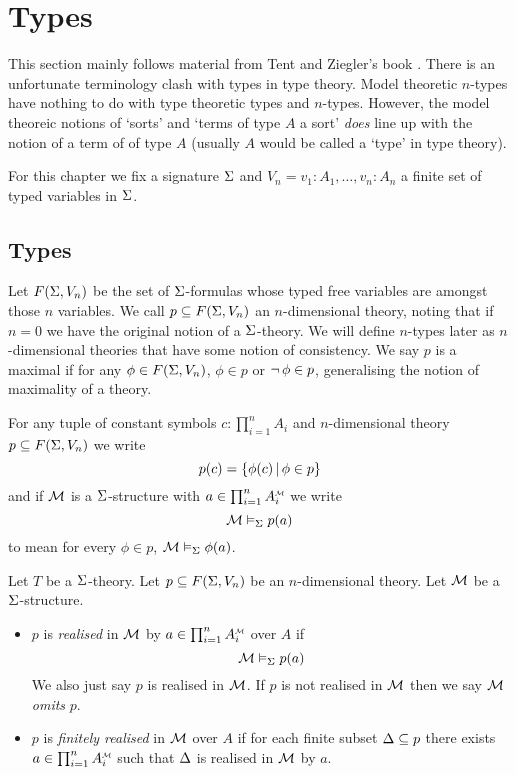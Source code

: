 \section{Types}
This section mainly follows material from Tent and Ziegler's book \cite{tent}.
There is an unfortunate terminology clash with types in type theory.
Model theoretic $n$-types have nothing to do with type theoretic 
types and $n$-types.
However, the model theoreic notions of `sorts' and `terms of type $A$ a sort' 
\textit{does} line up with the notion of a term of of type $A$ 
(usually $A$ would be called a `type' in type theory).

For this chapter we fix a signature $\Sigma$ and 
$V_n = {v_1 : A_1, \dots, v_n : A_n}$
a finite set of typed variables in $\Sigma$.

\subsection{Types}
\begin{dfn}
    Let $F(\Sigma,V_n)$ be the set of $\Sigma$-formulas whose typed free variables
    are amongst those $n$ variables.
    We call $p \subseteq F(\Sigma,V_n)$ an $n$-dimensional theory, 
    noting that if $n = 0$ we have the original notion of a $\Sigma$-theory.
    We will define $n$-types later as $n$-dimensional theories that have 
    some notion of consistency.
    We say $p$ is a maximal if for any $\phi \in F(\Sigma,V_n)$,
    $\phi \in p$ or $\neg\, \phi \in p$, 
    generalising the notion of maximality of a theory.

    For any tuple of constant symbols $c : \prod_{i = 1}^n A_i$
    and $n$-dimensional theory $p \subseteq F(\Sigma,V_n)$ we write 
    \[
        p(c) = \left\{\phi(c) \,|\, \phi \in p\right\}
    \]
    and if $\mathcal{M}$ is a $\Sigma$-structure with 
    $a \in \prod_{i=1}^n \mmintp{A_i}$ we write 
    \[
        \mathcal{M} \vDash_{\Sigma} p(a)
    \]
    to mean for every $\phi \in p$, $\mathcal{M} \vDash_{\Sigma} \phi(a)$.
\end{dfn}

\begin{dfn}[Realisation]
    Let $T$ be a $\Sigma$-theory.
    Let $p \subseteq F(\Sigma,V_n)$ be an $n$-dimensional theory.
    Let $\mathcal{M}$ be a $\Sigma$-structure.
    \begin{itemize}
        \item $p$ is \textit{realised} in $\mathcal{M}$ by 
        $a \in \prod_{i = 1}^n \mmintp{A_i}$ over $A$ if
            \[\mathcal{M} \vDash_{\Sigma} p(a)\]
            We also just say $p$ is realised in $\mathcal{M}$.
            If $p$ is not realised in $\mathcal{M}$
            then we say $\mathcal{M}$ \textit{omits} $p$.
        \item $p$ is \textit{finitely realised} in $\mathcal{M}$ 
            over $A$ if for each finite subset $\Delta \subseteq p$ 
            there exists $a \in \prod_{i = 1}^n \mmintp{A_i}$
            such that $\Delta$ is realised in $\mathcal{M}$ by $a$.
    \end{itemize}
\end{dfn}

